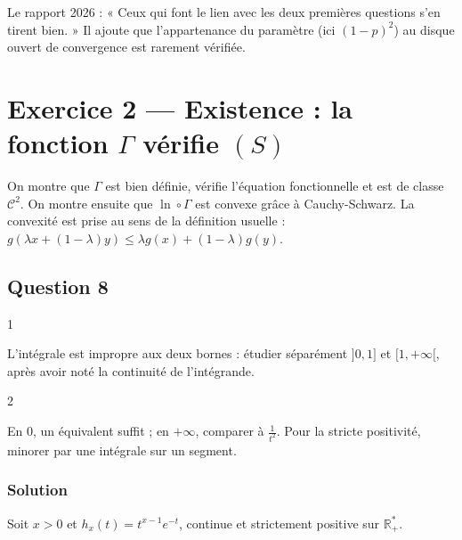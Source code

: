 \documentclass[11pt,a4paper]{article}
\begin{document}
\begin{jury}

Le rapport 2026 : « Ceux qui font le lien avec les deux premières questions s'en tirent bien. » Il ajoute que l'appartenance du paramètre (ici \((1-p)^2\)) au disque ouvert de convergence est rarement vérifiée.

\end{jury}

\hypertarget{exercice-2-existence-la-fonction-gamma-vuxe9rifie-s}{%
\section{\texorpdfstring{Exercice 2 --- Existence : la fonction \(\Gamma\) vérifie \((S)\)}{Exercice 2 --- Existence : la fonction \textbackslash Gamma vérifie (S)}}\label{exercice-2-existence-la-fonction-gamma-vuxe9rifie-s}}

On montre que \(\Gamma\) est bien définie, vérifie l'équation fonctionnelle et est de classe \(\mathcal C^2\). On montre ensuite que \(\ln\circ\Gamma\) est convexe grâce à Cauchy-Schwarz. La convexité est prise au sens de la définition usuelle : \(g(\lambda x+(1-\lambda)y)\le\lambda g(x)+(1-\lambda)g(y)\).

\hypertarget{question-8}{%
\subsection{Question 8}\label{question-8}}

\begin{indication}{1}

L'intégrale est impropre aux deux bornes : étudier séparément \(]0,1]\) et \([1,+\infty[\), après avoir noté la continuité de l'intégrande.

\end{indication}

\begin{indication}{2}

En \(0\), un équivalent suffit ; en \(+\infty\), comparer à \(\frac1{t^2}\). Pour la stricte positivité, minorer par une intégrale sur un segment.

\end{indication}

\hypertarget{solution-7}{%
\subsubsection{Solution}\label{solution-7}}

Soit \(x>0\) et \(h_x(t)=t^{x-1}e^{-t}\), continue et strictement positive sur \(\mathbb R_+^*\).
\end{document}
